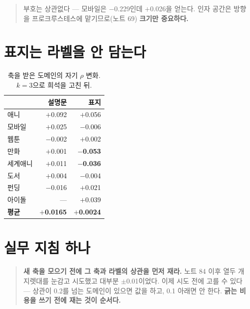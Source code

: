 \documentclass[10pt]{article}
\begin{document}
\begin{quote}\fontsize{9.5}{11.5}\selectfont
부호는 상관없다 --- 모바일은 $-$0.229인데 $+$0.026을 얻는다. 인자 공간은
방향을 프로크루스테스에 맡기므로(노트 69) \textbf{크기만 중요하다.}
\end{quote}

\section{표지는 라벨을 안 담는다}

\begin{table}[t]
\centering\tsize
\caption{축을 받은 도메인의 자기 $\rho$ 변화. $k{=}3$으로 희석을 고친 뒤.}
\begin{tabular}{lrr}
\toprule
& 설명문 & 표지 \\
\midrule
애니 & $+$0.092 & $+$0.056 \\
모바일 & $+$0.025 & $-$0.006 \\
웹툰 & $-$0.002 & $+$0.002 \\
만화 & $+$0.001 & \textbf{$-$0.053} \\
세계애니 & $+$0.011 & \textbf{$-$0.036} \\
도서 & $+$0.004 & $-$0.004 \\
펀딩 & $-$0.016 & $+$0.021 \\
아이돌 & --- & $+$0.039 \\
\midrule
\textbf{평균} & \textbf{$+$0.0165} & \textbf{$+$0.0024} \\
\bottomrule
\end{tabular}
\end{table}


\section{실무 지침 하나}

\begin{quote}\fontsize{9.5}{11.5}\selectfont
\textbf{새 축을 모으기 전에 그 축과 라벨의 상관을 먼저 재라.} 노트 84 이후
열두 개 지렛대를 눈감고 시도했고 대부분 $\pm$0.01이었다. 이제 시도 전에
고를 수 있다 --- 상관이 0.2를 넘는 도메인이 있으면 값을 하고, 0.1 아래면
안 한다. \textbf{긁는 비용을 쓰기 전에 재는 것이 순서다.}
\end{quote}
\end{document}
